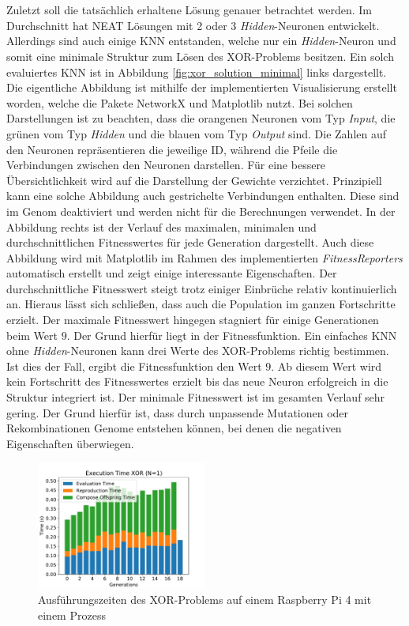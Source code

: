 \\\\
Zuletzt soll die tatsächlich erhaltene Lösung genauer betrachtet werden. Im Durchschnitt hat \ac{NEAT} Lösungen mit 2 oder 3 \emph{Hidden}-Neuronen entwickelt. Allerdings sind auch einige \ac{KNN} entstanden, welche nur ein \emph{Hidden}-Neuron und somit eine minimale Struktur zum Lösen des XOR-Problems besitzen. Ein solch evaluiertes \ac{KNN} ist in Abbildung \ref{fig:xor_solution_minimal} links dargestellt. Die eigentliche Abbildung ist mithilfe der implementierten Visualisierung erstellt worden, welche die Pakete NetworkX und Matplotlib nutzt. Bei solchen Darstellungen ist zu beachten, dass die orangenen Neuronen vom Typ \emph{Input}, die grünen vom Typ \emph{Hidden} und die blauen vom Typ \emph{Output} sind. Die Zahlen auf den Neuronen repräsentieren die jeweilige ID, während die Pfeile die Verbindungen zwischen den Neuronen darstellen. Für eine bessere Übersichtlichkeit wird auf die Darstellung der Gewichte verzichtet. Prinzipiell kann eine solche Abbildung auch gestrichelte Verbindungen enthalten. Diese sind im Genom deaktiviert und werden nicht für die Berechnungen verwendet. In der Abbildung rechts ist der Verlauf des maximalen, minimalen und durchschnittlichen Fitnesswertes für jede Generation dargestellt. Auch diese Abbildung wird mit Matplotlib im Rahmen des implementierten \emph{FitnessReporters} automatisch erstellt und zeigt einige interessante Eigenschaften. Der durchschnittliche Fitnesswert steigt trotz einiger Einbrüche relativ kontinuierlich an. Hieraus lässt sich schließen, dass auch die Population im ganzen Fortschritte erzielt. Der maximale Fitnesswert hingegen stagniert für einige Generationen beim Wert $9$. Der Grund hierfür liegt in der Fitnessfunktion. Ein einfaches \ac{KNN} ohne \emph{Hidden}-Neuronen kann drei Werte des XOR-Problems richtig bestimmen. Ist dies der Fall, ergibt die Fitnessfunktion den Wert $9$. Ab diesem Wert wird kein Fortschritt des Fitnesswertes erzielt bis das neue Neuron erfolgreich in die Struktur integriert ist. Der minimale Fitnesswert ist im gesamten Verlauf sehr gering. Der Grund hierfür ist, dass durch unpassende Mutationen oder Rekombinationen Genome entstehen können, bei denen die negativen Eigenschaften überwiegen. 
\begin{figure}[!h]
	\centering
	\includegraphics[width=0.5\textwidth]{./img/xor_single_core/xor_execution_time_1.pdf} 
	\caption{Ausführungszeiten des XOR-Problems auf einem Raspberry Pi 4 mit einem Prozess}
	\label{fig:xor_single_core_performance}
\end{figure}
